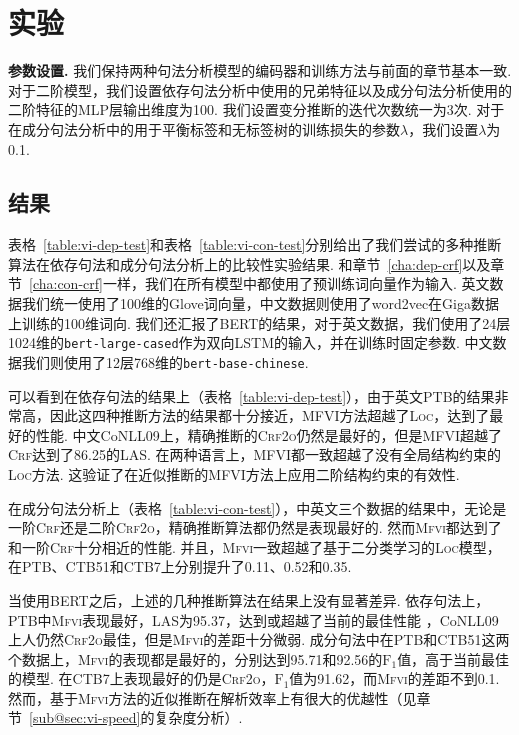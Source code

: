 \section{实验}\label{sec:vi-exp}

\noindent\textbf{参数设置.}
我们保持两种句法分析模型的编码器和训练方法与前面的章节基本一致.
对于二阶模型，我们设置依存句法分析中使用的兄弟特征以及成分句法分析使用的二阶特征的MLP层输出维度为100.
我们设置变分推断的迭代次数统一为3次.
对于在成分句法分析中的用于平衡标签和无标签树的训练损失的参数$\lambda$，我们设置$\lambda$为0.1.



\subsection{结果}
表格~\ref{table:vi-dep-test}和表格~\ref{table:vi-con-test}分别给出了我们尝试的多种推断算法在依存句法和成分句法分析上的比较性实验结果.
和章节~\ref{cha:dep-crf}以及章节~\ref{cha:con-crf}一样，我们在所有模型中都使用了预训练词向量作为输入.
英文数据我们统一使用了100维的Glove词向量，中文数据则使用了word2vec在Giga数据上训练的100维词向.
我们还汇报了BERT的结果，对于英文数据，我们使用了24层1024维的\texttt{bert-large-cased}作为双向LSTM的输入，并在训练时固定参数.
中文数据我们则使用了12层768维的\texttt{bert-base-chinese}.

可以看到在依存句法的结果上（表格~\ref{table:vi-dep-test}），由于英文PTB的结果非常高，因此这四种推断方法的结果都十分接近，\textsc{MFVI}方法超越了\textsc{Loc}，达到了最好的性能.
中文CoNLL09上，精确推断的\textsc{Crf2o}仍然是最好的，但是\textsc{MFVI}超越了\textsc{Crf}达到了86.25的LAS.
在两种语言上，\textsc{MFVI}都一致超越了没有全局结构约束的\textsc{Loc}方法.
这验证了在近似推断的\textsc{MFVI}方法上应用二阶结构约束的有效性.

在成分句法分析上（表格~\ref{table:vi-con-test}），中英文三个数据的结果中，无论是一阶\textsc{Crf}还是二阶\textsc{Crf2o}，精确推断算法都仍然是表现最好的.
然而\textsc{Mfvi}都达到了和一阶\textsc{Crf}十分相近的性能.
并且，\textsc{Mfvi}一致超越了基于二分类学习的\textsc{Loc}模型，在PTB、CTB51和CTB7上分别提升了0.11、0.52和0.35.

当使用BERT之后，上述的几种推断算法在结果上没有显著差异.
依存句法上，PTB中\textsc{Mfvi}表现最好，LAS为95.37，达到或超越了当前的最佳性能 \citep{zhou-zhao-2019-head,wang-tu-2020-second}，CoNLL09上人仍然\textsc{Crf2o}最佳，但是\textsc{Mfvi}的差距十分微弱.
成分句法中在PTB和CTB51这两个数据上，\textsc{Mfvi}的表现都是最好的，分别达到95.71和92.56的$\mathrm{F}_1$值，高于当前最佳的模型\cite{kitaev-etal-2019-multilingual}.
在CTB7上表现最好的仍是\textsc{Crf2o}，$\mathrm{F}_1$值为91.62，而\textsc{Mfvi}的差距不到0.1.
然而，基于\textsc{Mfvi}方法的近似推断在解析效率上有很大的优越性（见章节~\ref{sub@sec:vi-speed}的复杂度分析）.

